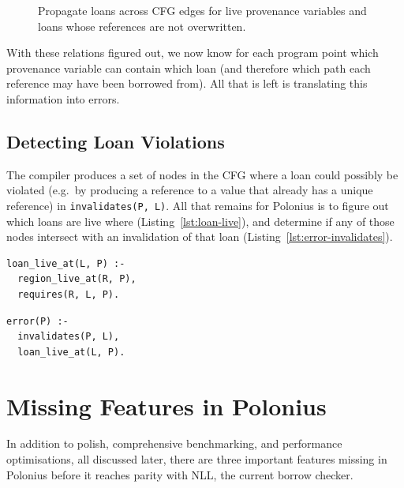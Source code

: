 \documentclass[11pt,a4paper,twoside,openany,draft]{report}
\newenvironment{sourcecode}{\captionsetup{type=listing}}{}
\newcommand{\InDatalog}[1]{\texttt{#1}}
\begin{document}
\begin{figure}
\caption[Rule for Propagating Loans Across CFG Edges]{Propagate loans across
  CFG edges for live provenance variables and loans whose references are not
  overwritten.}\label{fig:requires-edge}
\end{figure}

With these relations figured out, we now know for each program point which
provenance variable can contain which loan (and therefore which path each
reference may have been borrowed from). All that is left is translating this
information into errors.

\subsection{Detecting Loan Violations}

The compiler produces a set of nodes in the CFG where a loan could possibly be
violated (e.g.\ by producing a reference to a value that already has a unique
reference) in \InDatalog{invalidates(P, L)}. All that remains for Polonius is to
figure out which loans are live where (Listing~\ref{lst:loan-live}), and
determine if any of those nodes intersect with an invalidation of that loan
(Listing~\ref{lst:error-invalidates}).

\begin{sourcecode}
  \label{lst:loan-live}
\begin{verbatim}
loan_live_at(L, P) :-
  region_live_at(R, P),
  requires(R, L, P).
\end{verbatim}
\end{sourcecode}

\begin{sourcecode}
  \label{lst:error-invalidates}
\begin{verbatim}
error(P) :-
  invalidates(P, L),
  loan_live_at(L, P).
\end{verbatim}
\end{sourcecode}

\section{Missing Features in Polonius}\label{sec:missing-features}

In addition to polish, comprehensive benchmarking, and performance
optimisations, all discussed later, there are three important features missing
in Polonius before it reaches parity with NLL, the current borrow checker.
\end{document}
